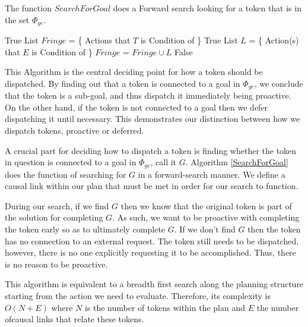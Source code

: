 \begin{algorithm} [H]
  \caption{\small The function $SearchForGoal$ does a Forward search
    looking for a token that is in the set $\Phi_{ge}$.}
\label{SearchForGoal}
\begin{algorithmic}
\small
{}
  \State \Return True
\Else 
  \State List $Fringe$ = \{ Actions that $T$ is Condition of \}
          \State \Return True
        \Else 
           \State List $L$ = \{ Action(s) that $E$ is Condition of \}
           \State $Fringe$ = $Fringe \cup L$ 
        \EndIf
      \EndFor
  \EndFor
\EndIf
\State \Return False
\EndFunction
\end{algorithmic}
\end{algorithm}

This Algorithm is the central deciding point for how a
token should be dispatched. By finding out that a token is connected
to a goal in $\Phi_{ge}$, we conclude that the token is a sub-goal,
and thus dispatch it immediately being proactive.  On the other hand,
if the token is not connected to a goal then we defer dispatching it
until necessary.  This demonstrates our distinction between how we
dispatch tokens, proactive or deferred.

A crucial part for deciding how to dispatch a token is finding whether
the token in question is connected to a goal in $\Phi_{ge}$, call it
$G$. Algorithm \ref{SearchForGoal} does the function of searching for
$G$ in a forward-search manner. We define a causal link within our
plan that must be met in order for our search to function.

During our search, if we find $G$ then we know that the original token
is part of the solution for completing $G$.  As such, we want to be
proactive with completing the token early so as to ultimately complete
$G$. If we don't find $G$ then the token has no connection to an
external request. The token still needs to be dispatched, however,
there is no one explicitly requesting it to be accomplished. Thus,
there is no reason to be proactive.

This algorithm is equivalent to a breadth first search along the
planning structure starting from the action we need to
evaluate. Therefore, its complexity is $O(N+E)$ where $N$ is the
number of tokens within the plan and $E$ the number ofcausal links that relate
these tokens. 

